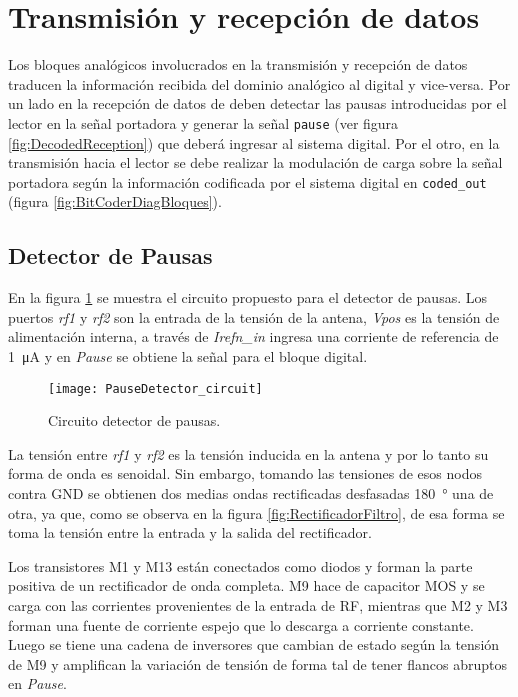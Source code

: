 \section{Transmisión y recepción de datos}

Los bloques analógicos involucrados en la transmisión y recepción de 
datos traducen la información recibida del dominio analógico al 
digital y vice-versa. Por un lado en la recepción de datos de deben 
detectar las pausas introducidas por el lector en la señal portadora 
y generar la señal \lstinline{pause} (ver figura 
\ref{fig:DecodedReception}) que deberá ingresar al sistema digital. 
Por el otro, en la transmisión hacia el lector se debe realizar la 
modulación de carga sobre la señal portadora según la información 
codificada por el sistema digital en \lstinline{coded_out} (figura 
\ref{fig:BitCoderDiagBloques}).

\subsection{Detector de Pausas}

En la figura \ref{fig:PauseDetectorCircuit} se muestra el circuito 
propuesto para el detector de pausas. Los puertos \emph{rf1} y 
\emph{rf2} son la entrada de la tensión de la antena, \emph{Vpos} es 
la tensión de alimentación interna, a través de \emph{Irefn\_in} 
ingresa una corriente de referencia de \SI{1}{\micro\ampere} y en 
\emph{Pause} se obtiene la señal para el bloque digital.

\begin{figure}
	\centering
	\texttt{[image: PauseDetector\_circuit]}
	\caption{Circuito detector de pausas.}
	\label{fig:PauseDetectorCircuit}
\end{figure}

La tensión entre \emph{rf1} y \emph{rf2} es la tensión inducida en 
la antena y por lo tanto su forma de onda es senoidal. Sin embargo, 
tomando las tensiones de esos nodos contra GND se obtienen 
dos medias ondas rectificadas desfasadas \SI{180}{\degree} una de 
otra, ya que, como se observa en la figura \ref{fig:RectificadorFiltro},
de esa forma se toma la tensión entre la entrada y la salida del 
rectificador. 

Los transistores M1 y M13 están conectados como diodos y forman 
la parte positiva de un rectificador de onda completa. M9 hace de 
capacitor MOS y se carga con las corrientes provenientes de la 
entrada de RF, mientras que M2 y M3 forman una fuente de corriente 
espejo que lo descarga a corriente constante. Luego se tiene una 
cadena de inversores que cambian de estado según la tensión de M9 y 
amplifican la variación de tensión de forma tal de tener flancos 
abruptos en \emph{Pause}.

